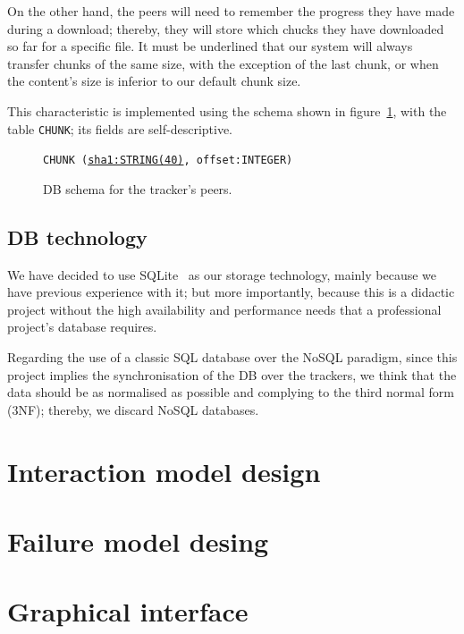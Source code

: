 \documentclass[twoside,a4paper,10pt]{article}
\begin{document}
On the other hand, the peers will need to remember the
progress they have made during a download; thereby, they will store which chucks
they have downloaded so far for a specific file. It must be underlined that our
system will always transfer chunks of the same size, with the exception of the
last chunk, or when the content's size is inferior to our default chunk size.

This characteristic is implemented using the schema shown in
figure~\ref{fig:schema-P}, with the table \texttt{CHUNK}; its
fields are self-descriptive.

\begin{figure}[h]
  
  \texttt{CHUNK (\underline{sha1:STRING(40)}, offset:INTEGER)}
  
  \centering
  \caption{\label{fig:schema-P}DB schema for the tracker's peers.}
\end{figure}

\subsection{DB technology}

We have decided to use SQLite~\cite{sqlite} as our storage technology,
mainly because we have previous experience with it; but more importantly,
because this is a didactic project without the high availability and performance
needs that a professional project's database requires.

Regarding the use of a classic SQL database over the NoSQL paradigm, since
this project implies the synchronisation of the DB over the trackers, we think
that the data should be as normalised as possible and complying to the third
normal form (3NF); thereby, we discard NoSQL databases.

\section{Interaction model design}

\section{Failure model desing}

\section{Graphical interface}




\end{document}
